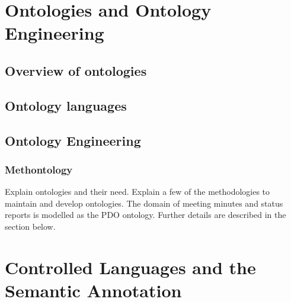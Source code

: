 \section{Ontologies and Ontology Engineering}
\subsection{Overview of ontologies}
\subsection{Ontology languages}
\subsection{Ontology Engineering}
\subsubsection{Methontology}

Explain ontologies and their need. Explain a few of the methodologies to maintain and develop ontologies. 
The domain of meeting minutes and status reports is modelled as the PDO ontology. Further details are described in the section below.

\section{Controlled Languages and the Semantic Annotation}
